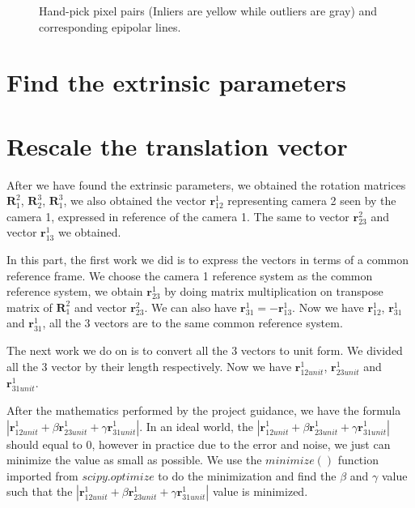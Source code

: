 \documentclass[10pt,twocolumn,letterpaper]{article}
\begin{document}
\begin{figure}[t]
{}

\caption{Hand-pick pixel pairs (Inliers are yellow while outliers are gray) and corresponding epipolar lines.}
\label{fig:epipolar}
\end{figure}

\section{Find the extrinsic parameters}


\section{Rescale the translation vector}
After we have found the extrinsic parameters, we obtained the rotation matrices $\textbf{R}_{1}^{2}$, $\textbf{R}_{2}^{3}$, $\textbf{R}_{1}^{3}$, we also obtained the vector $\textbf{r}_{12}^{1}$ representing camera 2 seen by the camera 1, expressed in reference of the camera 1. The same to vector $\textbf{r}_{23}^{2}$ and vector $\textbf{r}_{13}^{1}$ we obtained.

In this part, the first work we did is to express the vectors in terms of a common reference frame. We choose the camera 1 reference system as the common reference system, we obtain $\textbf{r}_{23}^{1}$ by doing matrix multiplication on transpose matrix of $\textbf{R}_{1}^{2}$ and vector $\textbf{r}_{23}^{2}$. We can also have $\textbf{r}_{31}^{1} = - \textbf{r}_{13}^{1}$. Now we have $\textbf{r}_{12}^{1}$, $\textbf{r}_{31}^{1}$ and $\textbf{r}_{31}^{1}$, all the 3 vectors are to the same common reference system.

The next work we do on is to convert all the 3 vectors to unit form. We divided all the 3 vector by their length respectively. Now we have $\textbf{r}_{12unit}^{1}$, $\textbf{r}_{23unit}^{1}$ and $\textbf{r}_{31unit}^{1}$. 

After the mathematics performed by the project guidance, we have the formula $| \textbf{r}_{12unit}^{1} + \beta  \textbf{r}_{23unit}^{1} + \gamma  \textbf{r}_{31unit}^{1} |$. In an ideal world, the $| \textbf{r}_{12unit}^{1} + \beta  \textbf{r}_{23unit}^{1} + \gamma  \textbf{r}_{31unit}^{1} |$ should equal to $0$, however in practice due to the error and noise, we just can minimize the value as small as possible. We use the $minimize()$ function imported from $scipy.optimize$ to do the minimization and find the $\beta$ and $\gamma$ value such that the $| \textbf{r}_{12unit}^{1} + \beta  \textbf{r}_{23unit}^{1} + \gamma  \textbf{r}_{31unit}^{1} |$ value is minimized.
\end{document}
